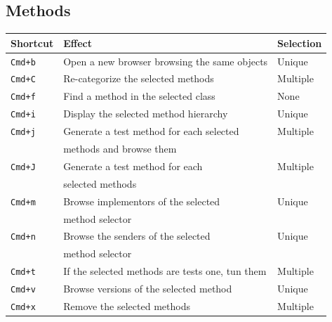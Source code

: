 \documentclass[a4paper,10pt,twoside]{book}
\begin{document}
\subsection{Methods}


\begin{tabular}{l | l | l}
Shortcut & Effect & Selection\\
\hline
\hline
\verb?Cmd+b? & Open a new browser browsing the same objects & Unique\\
\hline
\verb?Cmd+C? & Re-categorize the selected methods & Multiple\\
\hline
\verb?Cmd+f? & Find a method in the selected class & None\\
\hline
\verb?Cmd+i? & Display the selected method hierarchy & Unique\\
\hline
\verb?Cmd+j? & Generate a test method for each selected& Multiple\\
& methods and browse them&\\
\hline
\verb?Cmd+J? & Generate a test method for each & Multiple\\
&selected methods&\\
\hline
\verb?Cmd+m? & Browse implementors of the selected  & Unique\\
&method selector&\\
\hline
\verb?Cmd+n? & Browse the senders of the selected & Unique\\
&method selector &\\
\hline
\verb?Cmd+t? & If the selected methods are tests one, tun them & Multiple\\
\hline
\verb?Cmd+v? & Browse versions of the selected method & Unique\\
\hline
\verb?Cmd+x? & Remove the selected methods& Multiple\\
\hline
\end{tabular}
\end{document}
